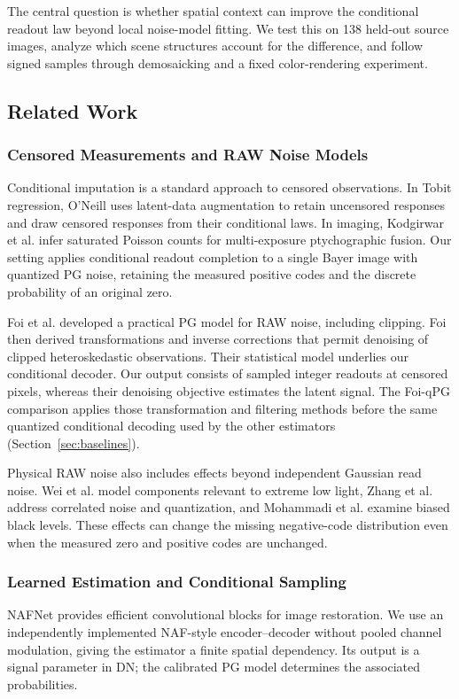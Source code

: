 \documentclass[10pt,twocolumn,journal]{IEEEtran}
\begin{document}
The central question is whether spatial context can improve the conditional readout law beyond local noise-model fitting. We test this on 138 held-out source images, analyze which scene structures account for the difference, and follow signed samples through demosaicking and a fixed color-rendering experiment.

\subsection{Related Work}
\subsubsection{Censored Measurements and RAW Noise Models}
Conditional imputation is a standard approach to censored observations. In Tobit regression, O'Neill \cite{oneill2024} uses latent-data augmentation to retain uncensored responses and draw censored responses from their conditional laws. In imaging, Kodgirwar et al. \cite{kodgirwar2024} infer saturated Poisson counts for multi-exposure ptychographic fusion. Our setting applies conditional readout completion to a single Bayer image with quantized PG noise, retaining the measured positive codes and the discrete probability of an original zero.

Foi et al. \cite{foi2008} developed a practical PG model for RAW noise, including clipping. Foi \cite{foi2009} then derived transformations and inverse corrections that permit denoising of clipped heteroskedastic observations. Their statistical model underlies our conditional decoder. Our output consists of sampled integer readouts at censored pixels, whereas their denoising objective estimates the latent signal. The Foi-qPG comparison applies those transformation and filtering methods before the same quantized conditional decoding used by the other estimators (Section~\ref{sec:baselines}).

Physical RAW noise also includes effects beyond independent Gaussian read noise. Wei et al. \cite{wei2020} model components relevant to extreme low light, Zhang et al. \cite{zhang2021} address correlated noise and quantization, and Mohammadi et al. \cite{mohammadi2026} examine biased black levels. These effects can change the missing negative-code distribution even when the measured zero and positive codes are unchanged.

\subsubsection{Learned Estimation and Conditional Sampling}
NAFNet \cite{nafnet} provides efficient convolutional blocks for image restoration. We use an independently implemented NAF-style encoder--decoder without pooled channel modulation, giving the estimator a finite spatial dependency. Its output is a signal parameter in DN; the calibrated PG model determines the associated probabilities.
\end{document}
